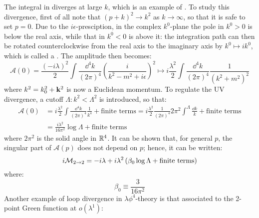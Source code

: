 The integral in  diverges at large $ k $, which is an example of . To study this divergence, first of all note that $ (p + k)^2 \rightarrow k^2 $ as $ k \rightarrow \infty $, so that it is safe to set $ p = 0 $. Due to the $ i\epsilon $-presciption, in the complex $ k^0 $-plane the pole in $ k^0 > 0 $ is below the real axis, while that in $ k^0 < 0 $ is above it: the integration path can then be rotated counterclockwise from the real axis to the imaginary axis by $ k^0 \mapsto i k^0 $, which is called a . The amplitude then becomes:
\begin{equation*}
    \mathcal{A}(0) = \frac{(-i \lambda)^2}{2} \int \frac{\dd^4k}{(2\pi)^4} \left( \frac{i}{k^2 - m^2 + i\epsilon} \right)^2 \mapsto i \frac{\lambda^2}{2} \int \frac{\dd^4k}{(2\pi)^4} \frac{1}{(k^2 + m^2)^2}
\end{equation*}
where $ k^2 = k_0^2 + \mathbf{k}^2 $ is now a Euclidean momentum. To regulate the UV divergence, a cutoff $ \Lambda : k^2 < \Lambda^2 $ is introduced, so that:
\begin{equation*}
  \begin{split}
    \mathcal{A}(0)
    & = i \frac{\lambda^2}{2} \int \frac{\dd^4k}{(2\pi)^4} \frac{1}{k^4} + \text{finite terms} = i \frac{\lambda^2}{2} \frac{1}{(2\pi)^4} 2\pi^2 \int^\Lambda \frac{\dd k}{k} + \text{finite terms}\\
    & = \frac{i \lambda^2}{16 \pi^2} \log \Lambda + \text{finite terms}
  \end{split}
\end{equation*}
where $ 2\pi^2 $ is the solid angle in $ \mathbb{R}^4 $. It can be shown that, for general $ p $, the singular part of $ \mathcal{A}(p) $ does not depend on $ p $; hence, it can be written:
\begin{equation*}
  i \mathcal{M}_{2 \rightarrow 2} = -i \lambda + i \lambda^2 \left( \beta_0 \log \Lambda + \text{finite terms} \right)
\end{equation*}
where:
\begin{equation}
  \beta_0 \equiv \frac{3}{16 \pi^2}
\end{equation}
Another example of loop divergence in $ \lambda \phi^4 $-theory is that associated to the 2-point Green function at $ o(\lambda^1) $:
